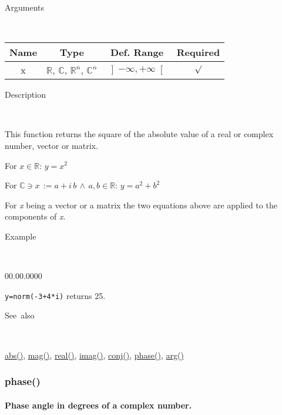 \begin{description}
\item [Arguments]~
\end{description}
\begin{tabular}{|c|c|c|c|}
\hline 
Name&
Type&
Def. Range&
Required\tabularnewline
\hline
\hline 
x&
$\mathbb{R}$, $\mathbb{C}$, $\mathbb{R}^{n}$, $\mathbb{C}^{n}$&
$\left]-\infty,+\infty\right[$&
$\surd$\tabularnewline
\hline
\end{tabular}

\begin{description}
\item [Description]~
\end{description}
This function returns the square of the absolute value of a real or
complex number, vector or matrix.

\medskip{}
For $x\in\mathbb{R}$: $y=x^{2}$
\medskip{}

For $\mathbb{\mathbb{C}}\ni x\,:=a+i\, b\,\wedge\, a,b\in\mathbb{R}$:
$y=a^{2}+b^{2}$
\medskip{}

For \textit{x} being a vector or a matrix the two equations above
are applied to the components of \textit{x}.

\begin{description}
\item [Example]~
\end{description}
\begin{lyxlist}{00.00.0000}
\item [\texttt{y=norm(-3+4{*}i)}]returns 25.
\end{lyxlist}
\begin{description}
\item [See~also]~
\end{description}
\textcolor{blue}{\hyperlink{abs}{abs()}}, \textcolor{blue}{\hyperlink{mag}{mag()}},
\textcolor{blue}{\hyperlink{real}{real()}}, \textcolor{blue}{\hyperlink{imag}{imag()}},
\textcolor{blue}{\hyperlink{conj}{conj()}}, \textcolor{blue}{\hyperlink{phase}{phase()}},
\textcolor{blue}{\hyperlink{arg}{arg()}}


\newpage
\subsubsection*{\hypertarget{phase}{}{\Large phase()}}


\paragraph{\label{par:Phase}Phase angle in degrees of a complex number.}

